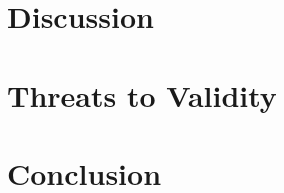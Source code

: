 \section{Discussion}
\label{sec:discussion}

	
\section{Threats to Validity}
\label{sec:threats}



\section{Conclusion}

\label{sec:conclusion}











